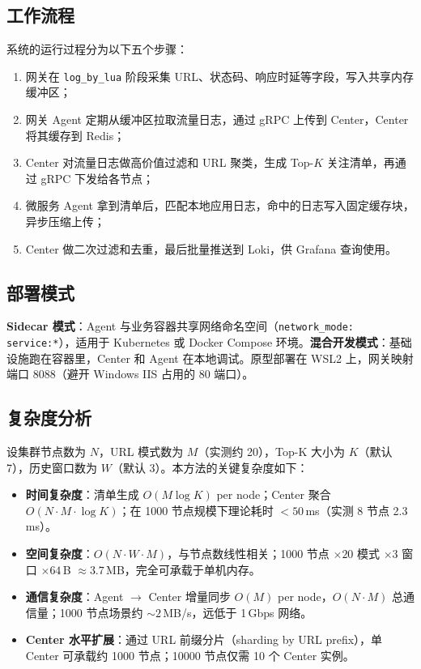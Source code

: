 \subsection{工作流程}
系统的运行过程分为以下五个步骤：
\begin{enumerate}
  \item 网关在 \texttt{log\_by\_lua} 阶段采集 URL、状态码、响应时延等字段，写入共享内存缓冲区；
  \item 网关 Agent 定期从缓冲区拉取流量日志，通过 gRPC 上传到 Center，Center 将其缓存到 Redis；
  \item Center 对流量日志做高价值过滤和 URL 聚类，生成 Top-$K$ 关注清单，再通过 gRPC 下发给各节点；
  \item 微服务 Agent 拿到清单后，匹配本地应用日志，命中的日志写入固定缓存块，异步压缩上传；
  \item Center 做二次过滤和去重，最后批量推送到 Loki，供 Grafana 查询使用。
\end{enumerate}

\subsection{部署模式}
\textbf{Sidecar 模式}：Agent 与业务容器共享网络命名空间（\texttt{network\_mode: service:*}），适用于 Kubernetes 或 Docker Compose 环境。\textbf{混合开发模式}：基础设施跑在容器里，Center 和 Agent 在本地调试。原型部署在 WSL2 上，网关映射端口 8088（避开 Windows IIS 占用的 80 端口）。

\subsection{复杂度分析}
设集群节点数为 $N$，URL 模式数为 $M$（实测约 20），Top-K 大小为 $K$（默认 7），历史窗口数为 $W$（默认 3）。本方法的关键复杂度如下：

\begin{itemize}
\item \textbf{时间复杂度}：清单生成 $O(M \log K)$ per node；Center 聚合 $O(N \cdot M \cdot \log K)$；在 1000 节点规模下理论耗时 $< 50$\,ms（实测 8 节点 2.3\,ms）。
\item \textbf{空间复杂度}：$O(N \cdot W \cdot M)$，与节点数线性相关；1000 节点 $\times 20$ 模式 $\times 3$ 窗口 $\times 64$\,B $\approx 3.7$\,MB，完全可承载于单机内存。
\item \textbf{通信复杂度}：Agent $\to$ Center 增量同步 $O(M)$ per node，$O(N \cdot M)$ 总通信量；1000 节点场景约 $\sim 2$\,MB/s，远低于 1\,Gbps 网络。
\item \textbf{Center 水平扩展}：通过 URL 前缀分片（sharding by URL prefix），单 Center 可承载约 1000 节点；10000 节点仅需 10 个 Center 实例。
\end{itemize}
